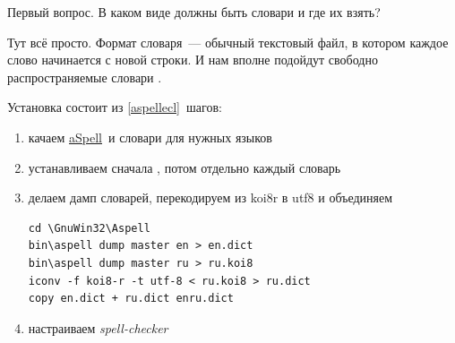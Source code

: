 Первый вопрос. В каком виде должны быть словари и где их взять?

Тут всё просто. Формат словаря\ --- обычный текстовый файл, в котором каждое
слово начинается с новой строки. И нам вполне подойдут свободно распространяемые
словари .

Установка состоит из \ref{aspellecl}\ шагов:
\begin{enumerate}
  \item качаем \href{}{aSpell}\ и словари для нужных языков
  
  
  
  
  
  \item устанавливаем сначала , потом отдельно каждый словарь
  
  
  
  
  
  
  
  
  \item делаем дамп словарей, перекодируем из koi8r в utf8 и объединяем
  

\begin{lstlisting}
cd \GnuWin32\Aspell
bin\aspell dump master en > en.dict
bin\aspell dump master ru > ru.koi8
iconv -f koi8-r -t utf-8 < ru.koi8 > ru.dict
copy en.dict + ru.dict enru.dict
\end{lstlisting}
  
  \item \label{aspellecl} настраиваем \emph{spell-checker} \eclipse
  
  
  
  
  
\end{enumerate}

